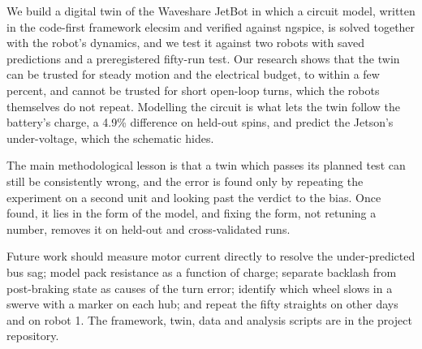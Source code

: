 \documentclass[conference,a4paper]{IEEEtran}
\begin{document}
We build a digital twin of the Waveshare JetBot in which a circuit model,
written in the code-first framework elecsim and verified against ngspice, is
solved together with the robot's dynamics, and we test it against two robots
with saved predictions and a preregistered fifty-run test. Our research
shows that the twin can be trusted for steady motion and the electrical
budget, to within a few percent, and cannot be trusted for short open-loop
turns, which the robots themselves do not repeat. Modelling the circuit is
what lets the twin follow the battery's charge, a 4.9\% difference on held-out
spins, and predict the Jetson's under-voltage, which the schematic hides.

The main methodological lesson is that a twin which passes its planned test
can still be consistently wrong, and the error is found only by repeating the
experiment on a second unit and looking past the verdict to the bias. Once
found, it lies in the form of the model, and fixing the form, not retuning a
number, removes it on held-out and cross-validated runs.

Future work should measure motor current directly to resolve the
under-predicted bus sag; model pack resistance as a function of charge;
separate backlash from post-braking state as causes of the turn error;
identify which wheel slows in a swerve with a marker on each hub; and repeat
the fifty straights on other days and on robot 1. The framework, twin, data
and analysis scripts are in the project repository.




\end{document}

